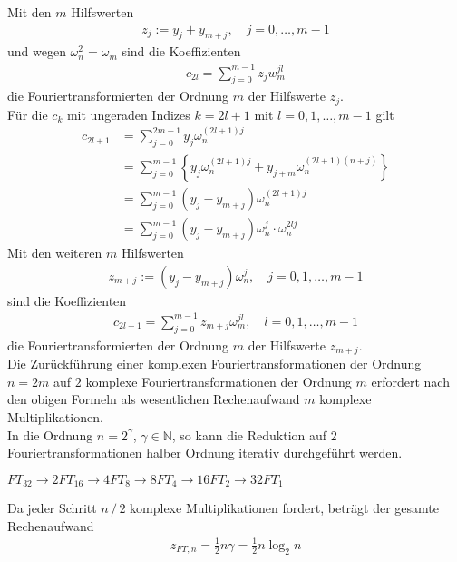 Mit den $m$ Hilfswerten 
\begin{align*}
  z_j := y_j + y_{m+j}, \quad j=0,\dots,m-1
\end{align*}
und wegen $\omega_n^2 = \omega_m$ sind die Koeffizienten 
\begin{align*}
  c_{2l} = \sum_{j=0}^{m-1} z_jw_m^{jl}
\end{align*}
die Fouriertransformierten der Ordnung $m$ der Hilfswerte $z_j$. \\
Für die $c_k$ mit ungeraden Indizes $k=2l+1$ mit $l=0,1,\dots,m-1$ gilt 
\begin{align*}
  c_{2l+1} &= \sum_{j=0}^{2m-1} y_j\omega_n^{(2l+1)j} \\
  &= \sum_{j=0}^{m-1}\left\{ y_j\omega_n^{(2l+1)j}+y_{j+m}\omega_n^{(2l+1)(n+j)}\right\}\\
  &= \sum_{j=0}^{m-1}(y_j-y_{m+j})\omega_n^{(2l+1)j} \\
  &= \sum_{j=0}^{m-1}(y_j-y_{m+j})\omega_n^{j}\cdot\omega_n^{2lj}
\end{align*}
Mit den weiteren $m$ Hilfswerten
\begin{align*}
  z_{m+j} := (y_j-y_{m+j})\omega_n^j,\quad j=0,1,\dots,m-1
\end{align*}
sind die Koeffizienten
\begin{align*}
  c_{2l+1} = \sum_{j=0}^{m-1} z_{m+j} \omega_m^{jl}, \quad l=0,1,\dots,m-1
\end{align*}
die Fouriertransformierten der Ordnung $m$ der Hilfswerte $z_{m+j}$. \\
Die Zurückführung einer komplexen Fouriertransformationen der Ordnung $n=2m$ auf $2$ komplexe Fouriertransformationen 
der Ordnung $m$ erfordert nach den obigen Formeln als wesentlichen Rechenaufwand $m$ komplexe Multiplikationen. \\
In die Ordnung $n=2^\gamma$, $\gamma\in\mathbb{N}$, so kann die Reduktion auf $2$ Fouriertransformationen halber Ordnung
iterativ durchgeführt werden. \\
\begin{egbox}
  $FT_{32} \to 2FT_{16}\to 4FT_8 \to 8FT_4 \to 16FT_2\to 32FT_1$
\end{egbox}
Da jeder Schritt $n\,/\,2$ komplexe Multiplikationen fordert, beträgt der gesamte Rechenaufwand
\begin{align*}
  z_{FT,n} = \tfrac{1}{2}n\gamma = \tfrac{1}{2}n\log_2 n
\end{align*}
